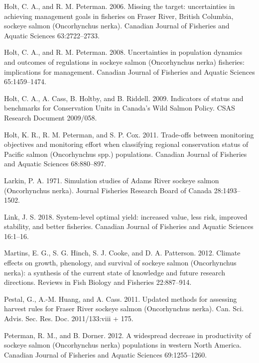 \documentclass[11pt]{book}
\begin{document}
{{{\hypertarget{ref-Holt2006}{}
Holt, C. A., and R. M. Peterman. 2006. Missing the target: uncertainties in achieving management goals in fisheries on Fraser River, British Columbia, sockeye salmon (Oncorhynchus nerka). Canadian Journal of Fisheries and Aquatic Sciences 63:2722--2733.

\hypertarget{ref-Holt2008}{}
Holt, C. A., and R. M. Peterman. 2008. Uncertainties in population dynamics and outcomes of regulations in sockeye salmon (Oncorhynchus nerka) fisheries: implications for management. Canadian Journal of Fisheries and Aquatic Sciences 65:1459--1474.

\hypertarget{ref-Holt2009}{}
Holt, C. A., A. Cass, B. Holtby, and B. Riddell. 2009. Indicators of status and benchmarks for Conservation Units in Canada's Wild Salmon Policy. CSAS Research Document 2009/058.

\hypertarget{ref-KHolt2011}{}
Holt, K. R., R. M. Peterman, and S. P. Cox. 2011. Trade-offs between monitoring objectives and monitoring effort when classifying regional conservation status of Pacific salmon (Oncorhynchus spp.) populations. Canadian Journal of Fisheries and Aquatic Sciences 68:880--897.

\hypertarget{ref-Larkin1971}{}
Larkin, P. A. 1971. Simulation studies of Adams River sockeye salmon (Oncorhynchus nerka). Journal Fisheries Research Board of Canada 28:1493--1502.

\hypertarget{ref-Link2018}{}
Link, J. S. 2018. System-level optimal yield: increased value, less risk, improved stability, and better fisheries. Canadian Journal of Fisheries and Aquatic Sciences 16:1--16.

\hypertarget{ref-Martins2012}{}
Martins, E. G., S. G. Hinch, S. J. Cooke, and D. A. Patterson. 2012. Climate effects on growth, phenology, and survival of sockeye salmon (Oncorhynchus nerka): a synthesis of the current state of knowledge and future research directions. Reviews in Fish Biology and Fisheries 22:887--914.

\hypertarget{ref-Pestal2011}{}
Pestal, G., A.-M. Huang, and A. Cass. 2011. Updated methods for assessing harvest rules for Fraser River sockeye salmon (Oncorhynchus nerka). Can. Sci. Advis. Sec. Res. Doc. 2011/133:viii + 175.

\hypertarget{ref-Peterman2012}{}
Peterman, R. M., and B. Dorner. 2012. A widespread decrease in productivity of sockeye salmon (Oncorhynchus nerka) populations in western North America. Canadian Journal of Fisheries and Aquatic Sciences 69:1255--1260.

}}}
\end{document}

